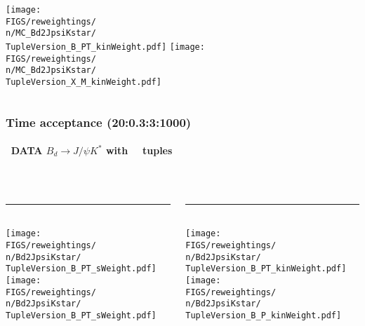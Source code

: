 {\begin{frame}
\begin{columns}[T]
\begin{column}{0.48\textwidth}
  \texttt{[image: \\FIGS/reweightings/\\n/MC\_Bd2JpsiKstar/\\TupleVersion\_B\_PT\_kinWeight.pdf]}
  \texttt{[image: \\FIGS/reweightings/\\n/MC\_Bd2JpsiKstar/\\TupleVersion\_X\_M\_kinWeight.pdf]}
\end{column}
\end{columns}
\end{frame} %
%
\begin{frame} %
\frametitle{Time acceptance (20:0.3:3:1000)}
\framesubtitle{\n \, DATA $B_d\rightarrow J/\psi K^*$ with \, \TupleVersion\, tuples}
\vspace*{-0.2cm}
\begin{columns}[T]
\begin{column}{0.48\textwidth}
\\[-4mm]\rule{\columnwidth}{0.1mm}\\[1mm]
  \texttt{[image: \\FIGS/reweightings/\\n/Bd2JpsiKstar/\\TupleVersion\_B\_PT\_sWeight.pdf]}
  \texttt{[image: \\FIGS/reweightings/\\n/Bd2JpsiKstar/\\TupleVersion\_B\_PT\_sWeight.pdf]}
\end{column}
\begin{column}{0.48\textwidth}
\\[-4mm]\rule{\columnwidth}{0.1mm}\\[1mm]
  \texttt{[image: \\FIGS/reweightings/\\n/Bd2JpsiKstar/\\TupleVersion\_B\_PT\_kinWeight.pdf]}
  \texttt{[image: \\FIGS/reweightings/\\n/Bd2JpsiKstar/\\TupleVersion\_B\_P\_kinWeight.pdf]}
\end{column}
\end{columns}
\end{frame} %
%
}






